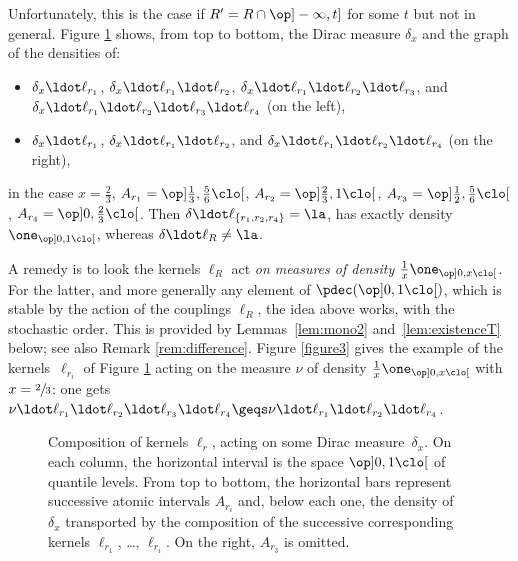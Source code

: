 \begin{rem}
Unfortunately, this is the case if $R'=R\cap\op]-\infty,t]$ for some $t$ but not in general. Figure \ref{figure2} shows, from top to bottom, the Dirac measure $\delta_x$ and the graph of the densities of:
\begin{itemize}
\item
$\delta_x \ldot\ell_{r_1}$, $\delta_x \ldot\ell_{r_1}{}\ldot\ell_{r_2}$, $\delta_x \ldot\ell_{r_1}{}\ldot\ell_{r_2}{}\ldot\ell_{r_3}$, and $\delta_x \ldot\ell_{r_1}{}\ldot\ell_{r_2}{}\ldot\ell_{r_3}{}\ldot\ell_{r_4}$ (on the left),

\item
$\delta_x \ldot\ell_{r_1}$, $\delta_x \ldot\ell_{r_1}{}\ldot\ell_{r_2}$, and $\delta_x \ldot\ell_{r_1}{}\ldot\ell_{r_2}{}\ldot\ell_{r_4}$ (on the right),
\end{itemize}
in the case $x=\frac23$, $A_{r_1}=\op]\frac13,\frac56\clo[$, $A_{r_2}=\op]\frac23,1\clo[$, $A_{r_3}=\op]\frac12,\frac56\clo[$, $A_{r_4}=\op]0,\frac23\clo[$. Then $\delta\ldot\ell_{\{r_1,r_2,r_4\}}=\la$, \ie has exactly density $\one_{\op]0,1\clo[}$, whereas $\delta\ldot\ell_{R}\neq\la$.

A remedy is to look the kernels $\ell_R$ act \emph{on measures of density $\frac1x\one_{\op]0,x\clo[}$}. For the latter, and more generally any element of
$\pdec(\op]0,1\clo[)$, which is stable by the action of the couplings $\ell_R$, the idea above works, with the stochastic order. This is provided by Lemmas~\ref{lem:mono2} and~\ref{lem:existenceT} below; see also Remark \ref{rem:difference}. Figure \ref{figure3} gives the example of the kernels~$\ell_{r_i}$ of Figure \ref{figure2} acting on the measure $\nu$ of density $\frac1x\one_{\op]0,x\clo[}$ with $x=\sfrac23$: one gets \hbox{$\nu\ldot\ell_{r_1}{}\ldot\ell_{r_2}{}\ldot\ell_{r_3}{}\ldot\ell_{r_4}\geqs\nu\ldot\ell_{r_1}{}\ldot\ell_{r_2}{}\ldot\ell_{r_4}$}.
\end{rem}

\begin{figure}
\def\svgwidth{.7\textwidth}
\hspace*{\fill}\hspace*{\fill}\mbox{}\hspace*{\fill}
\caption{Composition of kernels $\ell_r$, acting on some Dirac measure~$\delta_x$. On each column, the horizontal interval is the space $\op]0,1\clo[$ of quantile levels. From top to bottom, the horizontal bars represent successive atomic intervals $A_{r_i}$ and, below each one, the density of~$\delta_x$ transported by the composition of the successive corresponding kernels $\ell_{r_1}$, \ldots, $\ell_{r_i}$. On the right, $A_{r_3}$ is omitted.}\label{figure2}
\end{figure}

